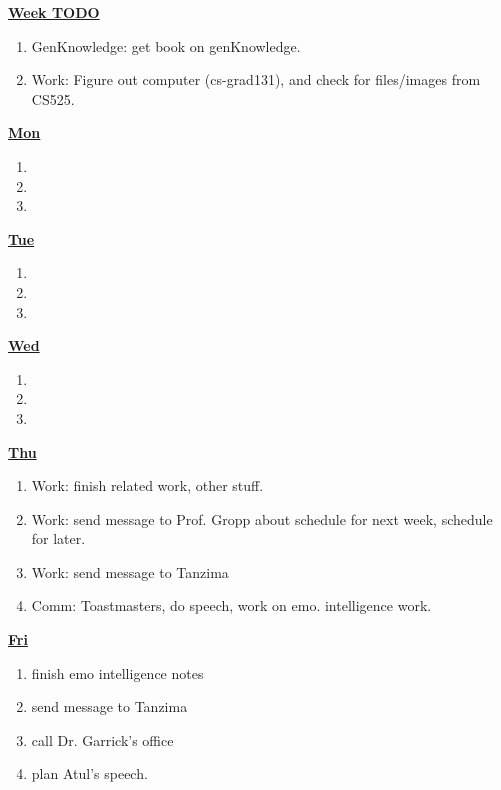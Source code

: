\documentclass[serif,mathserif,final]{beamer}
\begin{document}
\begin{frame}{}
\begin{columns}[t]
\begin{column}{0.33\linewidth}{\textbf{\underline{Week TODO}}}
\begin{block}
\begin{enumerate}
\item \tiny GenKnowledge: get book on genKnowledge. 
\item \tiny Work: Figure out computer (cs-grad131), and check for files/images from CS525. 
\end{enumerate}
\end{block} 

\begin{block} 

\textbf{\underline{Mon}}
\begin{enumerate} 
\tiny \item \tiny 
\item \tiny 
\item \tiny 
\end{enumerate} 


\textbf{\underline{Tue}}
\begin{enumerate} 
\tiny \item \tiny 
\item \tiny 
\item \tiny 
\end{enumerate} 


\textbf{\underline{Wed}}
\begin{enumerate} 
\tiny \item \tiny 
\item \tiny 
\item \tiny 
\end{enumerate} 

\textbf{\underline{Thu}}
\begin{enumerate} 
\tiny \item \tiny Work: finish related work, other stuff. 
\item \tiny Work: send message to Prof. Gropp about schedule for next
  week, schedule for later. 
\item \tiny Work: send message to Tanzima 

\item \tiny Comm: Toastmasters, do speech, work on emo. intelligence
  work. 

\end{enumerate} 

\textbf{\underline{Fri}}

\begin{enumerate} 
\tiny \item \tiny finish emo intelligence notes 
\item \tiny send message to Tanzima 
\item \tiny call Dr. Garrick's office 
\item \tiny plan Atul's speech. 
\end{enumerate} 


\end{block}
\end{column}
\end{columns}
\end{frame}
\end{document}
